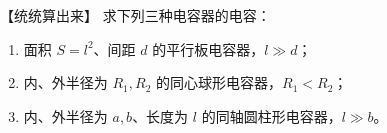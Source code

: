\newcommand{\atmosphereCapacitorDiagram}{%
\begin{center}
\begin{tikzpicture}[scale=0.83,>=Latex]
  \fill[PaleBlue] (0,0) circle (2.18); \fill[white] (0,0) circle (1.86);
  \fill[SoftGray] (0,0) circle (1.62);
  \draw[curve] (0,0) circle (1.62); \draw[DeepBlue,thick] (0,0) circle (2.18);
  \node at (0,0) {地球};
  \foreach \a in {0,35,...,325}{
    \node[Ink] at ({1.72*cos(\a)},{1.72*sin(\a)}) {$-$};
    \node[DeepBlue] at ({2.05*cos(\a)},{2.05*sin(\a)}) {$+$};
  }
  \draw[<->] (2.35,0)--node[right] {$h$}(2.35,0.56);
  \node[TextGray,align=left,anchor=west] at (4.1,0.7)
    {内半径 $R_\oplus$\\外半径 $R_\oplus+h$\\大气同时提供电容与漏电电阻};
\end{tikzpicture}

\figcap{理想化的大气球形电容器模型}\label{appE:fig:s21-legacy-15}
\end{center}}


\begin{origexamplebox}{【统统算出来】}\label{appE:ex:s21-32-1}
求下列三种电容器的电容：
\begin{enumerate}[label=(\arabic*),leftmargin=2.2em]
  \item 面积 $S=l^2$、间距 $d$ 的平行板电容器，$l\gg d$；
  \item 内、外半径为 $R_1,R_2$ 的同心球形电容器，$R_1<R_2$；
  \item 内、外半径为 $a,b$、长度为 $l$ 的同轴圆柱形电容器，$l\gg b$。
\end{enumerate}

\end{origexamplebox}

